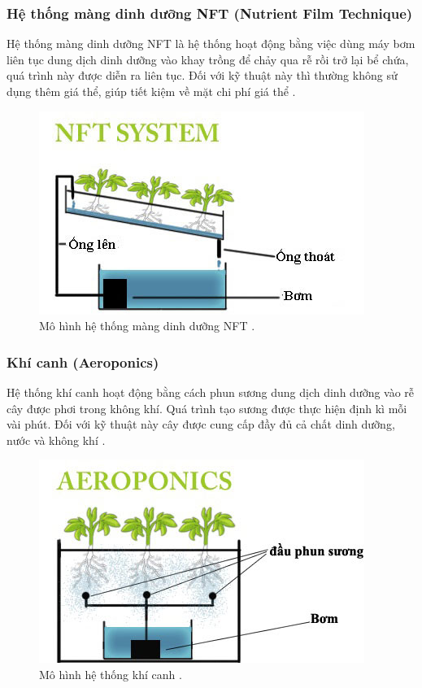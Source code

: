 \documentclass[a4paper,12pt,oneside]{article}
\begin{document}
\subsubsection{Hệ thống màng dinh dưỡng NFT (Nutrient Film Technique)}
\noindent Hệ thống màng dinh dưỡng NFT là hệ thống hoạt động bằng việc dùng máy bơm liên tục dung dịch dinh dưỡng vào khay trồng để chảy qua rễ rồi trở lại bể chứa, quá trình này được diễn ra liên tục. Đối với kỹ thuật này thì thường không sử dụng thêm giá thể, giúp tiết kiệm về mặt chi phí giá thể \cite{thuycanh}.

\begin{figure}[H]
	\centering
	\includegraphics[scale=.8]{hinh/NFT_system.jpg}
	\caption{Mô hình hệ thống màng dinh dưỡng NFT \cite{thuycanh}.}
	\label{fig:NFT_system}
\end{figure}


\subsubsection{Khí canh (Aeroponics)}

\noindent Hệ thống khí canh hoạt động bằng cách phun sương dung dịch dinh dưỡng vào rễ cây được phơi trong không khí. Quá trình tạo sương được thực hiện định kì mỗi vài phút. Đối với kỹ thuật này cây được cung cấp đầy đủ cả chất dinh dưỡng, nước và không khí \cite{thuycanh}.

\begin{figure}[H]
	\centering
	\includegraphics[scale=.9]{hinh/aeroponics.jpg}
	\caption{Mô hình hệ thống khí canh \cite{thuycanh}.}
	\label{fig:aeroponics}
\end{figure}
\end{document}
